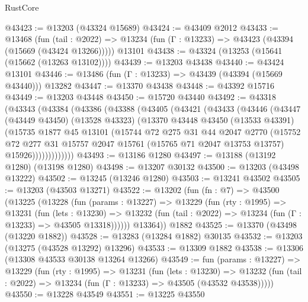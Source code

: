 \begin{lexlean}{RustCore}
\begin{coremodule}
@43423 := @13203 (@43324 @15689)
@43424 := @43409 @2012
@43433 := @13468
    (fun (tail : @2022) => @13234 (fun (Γ : @13233) => @43423 (@43394 (@15669 (@43424 @13266)))))
    @13101
@43438 := @43324 (@13253 (@15641 (@15662 (@13263 @13102))))
@43439 := @13203 @43438
@43440 := @43424 @13101
@43446 := @13486 (fun (Γ : @13233) => @43439 (@43394 (@15669 @43440))) @13282
@43447 := @13370 @43438
@43448 := @43392 @15716
@43449 := @13203 @43448
@43450 := @15720 @43440
@43492 := @43318
    (@43343
      (@43384
        (@43386
          (@43388
            (@43405
              (@43421
                (@43433
                  (@43446
                    (@43447
                      (@43449 @43450)
                      (@13528 @43323)
                      (@13370
                        @43448
                        @43450
                        (@13533 @43391)
                        (@15735
                          @1877
                          @45
                          @13101
                          (@15744
                            @72
                            @275
                            @31
                            @44
                            @2047
                            @2770
                            (@15752
                              @72
                              @277
                              @31
                              @15757
                              @2047
                              @15761
                              (@15765 @71 @2047 @13753 @13757)
                              @15926)))))))))))))
@43493 := @13186 @1280
@43497 := @13188 (@13192 @1280) (@13198 @1280)
@43498 := @13207 @30132
@43500 := @13203 (@43498 @13222)
@43502 := @13245 (@13246 @1280)
@43503 := @13241 @43502
@43505 := @13203 (@43503 @13271)
@43522 := @13202
    (fun (fn : @7) =>
    @43500
      (@13225
        (@13228
          (fun (params : @13227) =>
          @13229
            (fun (rty : @1995) =>
            @13231
              (fun (lets : @13230) =>
              @13232 (fun (tail : @2022) => @13234 (fun (Γ : @13233) => @43505 @13318))))))
        @13364))
    @1882
@43525 := @13370 (@43498 (@13220 @1882))
@43528 := @13283 (@13284 @1882) @30135
@43532 := @13203 (@13275 (@43528 @13292) @13296)
@43533 := @13309 @1882
@43538 := @13306 (@13308 @43533 @30138 @13264 @13266)
@43549 := fun (params : @13227) =>
  @13229
    (fun (rty : @1995) =>
    @13231
      (fun (lets : @13230) =>
      @13232 (fun (tail : @2022) => @13234 (fun (Γ : @13233) => @43505 (@43532 @43538)))))
@43550 := @13228 @43549
@43551 := @13225 @43550

\end{coremodule}
\end{lexlean}
